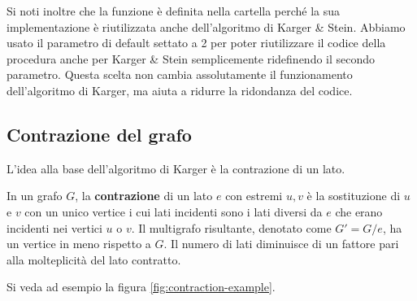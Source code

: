 \vspace{10pt}
\noindent Si noti inoltre che la funzione  è definita nella cartella  perché la sua implementazione è riutilizzata anche dell'algoritmo di Karger \& Stein. Abbiamo usato il parametro di default  settato a 2 per poter riutilizzare il codice della procedura anche per Karger \& Stein semplicemente ridefinendo il secondo parametro. Questa scelta non cambia assolutamente il funzionamento dell'algoritmo di Karger, ma aiuta a ridurre la ridondanza del codice.

\subsection{Contrazione del grafo}
\label{sub:karger-contraction}

L'idea alla base dell'algoritmo di Karger è la contrazione di un lato.

\begin{defn}
In un grafo $ G $, la \textbf{contrazione} di un lato $e$ con estremi $u, v$ è la sostituzione di $ u $ e $ v $ con un unico vertice i cui lati incidenti sono i lati diversi da $ e $ che erano incidenti nei vertici $ u $ o $ v $.
Il multigrafo risultante, denotato come $G' = G/e$, ha un vertice in meno rispetto a $G$. Il numero di lati diminuisce di un fattore pari alla molteplicità del lato contratto.
\end{defn}

\noindent Si veda ad esempio la figura \ref{fig:contraction-example}.



